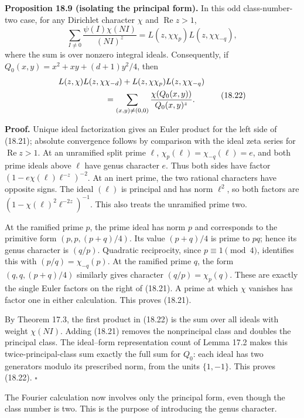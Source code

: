 \documentclass[
  11pt,
  a4paper,
]{article}
\begin{document}
\textbf{Proposition 18.9 (isolating the principal form).} In this odd
class-number-two case, for any Dirichlet character \(\chi\) and
\(\operatorname{Re}z>1\), \[
 \sum_{I\ne0}\frac{\psi(I)\chi(NI)}{(NI)^z}
 =L(z,\chi\chi_p)L(z,\chi\chi_{-q}),
 \tag{18.21}
\] where the sum is over nonzero integral ideals. Consequently, if
\(Q_0(x,y)=x^2+xy+(d+1)y^2/4\), then \[
 \begin{aligned}
 &L(z,\chi)L(z,\chi\chi_{-d})
  +L(z,\chi\chi_p)L(z,\chi\chi_{-q})\\
 &\hspace{20mm}=\sum_{(x,y)\ne(0,0)}
       \frac{\chi(Q_0(x,y))}{Q_0(x,y)^z}.
 \end{aligned}
 \tag{18.22}
\]

\textbf{Proof.} Unique ideal factorization gives an Euler product for
the left side of (18.21); absolute convergence follows by comparison
with the ideal zeta series for \(\operatorname{Re}z>1\). At an
unramified split prime \(\ell\), \(\chi_p(\ell)=\chi_{-q}(\ell)=e\), and
both prime ideals above \(\ell\) have genus character \(e\). Thus both
sides have factor \((1-e\chi(\ell)\ell^{-z})^{-2}\). At an inert prime,
the two rational characters have opposite signs. The ideal \((\ell)\) is
principal and has norm \(\ell^2\), so both factors are
\((1-\chi(\ell)^2\ell^{-2z})^{-1}\). This also treats the unramified
prime two.

At the ramified prime \(p\), the prime ideal has norm \(p\) and
corresponds to the primitive form \((p,p,(p+q)/4)\). Its value
\((p+q)/4\) is prime to \(pq\); hence its genus character is \((q/p)\).
Quadratic reciprocity, since \(p\equiv1\pmod4\), identifies this with
\((p/q)=\chi_{-q}(p)\). At the ramified prime \(q\), the form
\((q,q,(p+q)/4)\) similarly gives character \((q/p)=\chi_p(q)\). These
are exactly the single Euler factors on the right of (18.21). A prime at
which \(\chi\) vanishes has factor one in either calculation. This
proves (18.21).

By Theorem 17.3, the first product in (18.22) is the sum over all ideals
with weight \(\chi(NI)\). Adding (18.21) removes the nonprincipal class
and doubles the principal class. The ideal--form representation count of
Lemma 17.2 makes this twice-principal-class sum exactly the full sum for
\(Q_0\): each ideal has two generators modulo its prescribed norm, from
the units \(\{1,-1\}\). This proves (18.22). \(\square\)

The Fourier calculation now involves only the principal form, even
though the class number is two. This is the purpose of introducing the
genus character.
\end{document}
